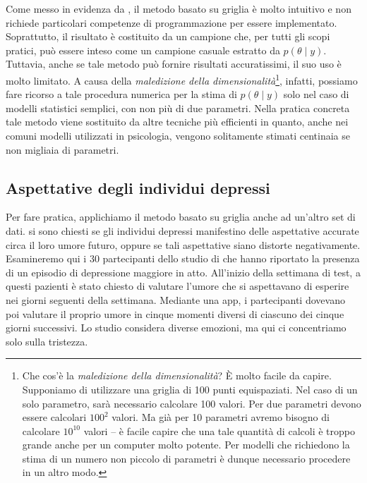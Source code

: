 \documentclass[
]{memoir}
\begin{document}
Come messo in evidenza da \citet{Johnson2022bayesrules}, il metodo basato su griglia è molto intuitivo e non richiede particolari competenze di programmazione per essere implementato. Soprattutto, il risultato è costituito da un campione che, per tutti gli scopi pratici, può essere inteso come un campione casuale estratto da \(p(\theta \mid y)\). Tuttavia, anche se tale metodo può fornire risultati accuratissimi, il suo uso è molto limitato. A causa della \emph{maledizione della dimensionalità}\footnote{Che cos'è la \emph{maledizione della dimensionalità}? È molto facile da capire. Supponiamo di utilizzare una griglia di 100 punti equispaziati. Nel caso di un solo parametro, sarà necessario calcolare 100 valori. Per due parametri devono essere calcolari \(100^2\) valori. Ma già per 10 parametri avremo bisogno di calcolare \(10^{10}\) valori -- è facile capire che una tale quantità di calcoli è troppo grande anche per un computer molto potente. Per modelli che richiedono la stima di un numero non piccolo di parametri è dunque necessario procedere in un altro modo.}, infatti, possiamo fare ricorso a tale procedura numerica per la stima di \(p(\theta \mid y)\) solo nel caso di modelli statistici semplici, con non più di due parametri. Nella pratica concreta tale metodo viene sostituito da altre tecniche più efficienti in quanto, anche nei comuni modelli utilizzati in psicologia, vengono solitamente stimati centinaia se non migliaia di parametri.

\hypertarget{es-pratico-zetsche}{%
\subsection{Aspettative degli individui depressi}\label{es-pratico-zetsche}}

Per fare pratica, applichiamo il metodo basato su griglia anche ad un'altro set di dati. \citet{zetschefuture2019} si sono chiesti se gli individui depressi manifestino delle aspettative accurate circa il loro umore futuro, oppure se tali aspettative siano distorte negativamente. Esamineremo qui i 30 partecipanti dello studio di \citet{zetschefuture2019} che hanno riportato la presenza di un episodio di depressione maggiore in atto. All'inizio della settimana di test, a questi pazienti è stato chiesto di valutare l'umore che si aspettavano di esperire nei giorni seguenti della settimana. Mediante una app, i partecipanti dovevano poi valutare il proprio umore in cinque momenti diversi di ciascuno dei cinque giorni successivi. Lo studio considera diverse emozioni, ma qui ci concentriamo solo sulla tristezza.
\end{document}
